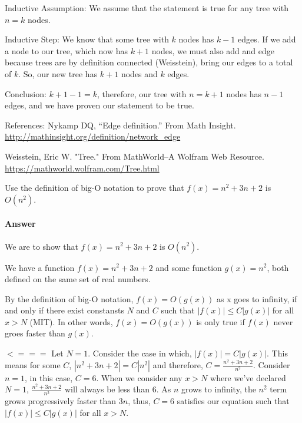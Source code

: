 \documentclass{article}
\begin{document}
Inductive Assumption: We assume that the statement is true for any tree with $n = k$ nodes.

Inductive Step: We know that some tree with $k$ nodes has $k - 1$ edges. If we add a node to our tree,
which now has $k + 1$ nodes, we must also add and edge because trees are by definition connected (Weisstein), bring our edges to a total of $k$. 
So, our new tree has $k + 1$ nodes and $k$ edges. 

Conclusion: $k + 1 - 1 = k$, therefore, our tree with $n = k + 1$ nodes has $n -1$ edges, and we have proven our statement to be true. 


References: 
\newline Nykamp DQ, “Edge definition.” From Math Insight. \url{http://mathinsight.org/definition/network_edge}

 Weisstein, Eric W. "Tree." From MathWorld--A Wolfram Web Resource. \url{https://mathworld.wolfram.com/Tree.html}





\nextprob
Use the definition of big-O notation to prove that $f(x)=n^2 + 3n +2$ is
$O(n^2)$.

\paragraph{Answer}

We are to show that $f(x)=n^2 + 3n +2$ is
$O(n^2)$.

We have a function $f(x)=n^2 + 3n +2$ and some function $g(x) = n^2$, both defined on the same set of real numbers. 

By the definition of big-O notation, $f(x) = O(g(x))$ as x goes to infinity, if and only if there exist constansts $N$ and 
$C$ such that $|f(x)| \leq C|g(x)|$ for all $x > N$ (MIT). In other words, $f(x) = O(g(x))$ is only true if $f(x)$ never groes faster than $g(x)$. 

$<===$
\newline Let $N = 1$. Consider the case in which, $|f(x)| =  C|g(x)|$. This means for some $C$, $|n^2 + 3n +2| = C|n^2|$ and therefore, $ C = \frac{n^2 + 3n + 2}{n^2}$. Consider $n = 1$, in this case, $C = 6$.  When we consider any $x > N$ where we've declared $N = 1$, $\frac{n^2 + 3n + 2}{n^2}$ will always be less than 6. 
As $n$ grows to infinity, the $n^2$ term grows progressively faster than $3n$, thus,  $C = 6$ satisfies our equation such that $|f(x)| \leq C|g(x)|$ for all $x > N$. 
\end{document}
